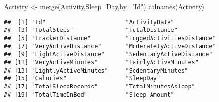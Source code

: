 \documentclass[
]{article}
\newenvironment{Shaded}{\begin{snugshade}}{\end{snugshade}}
\newcommand{\AttributeTok}[1]{\textcolor[rgb]{0.77,0.63,0.00}{#1}}
\newcommand{\DecValTok}[1]{\textcolor[rgb]{0.00,0.00,0.81}{#1}}
\newcommand{\FunctionTok}[1]{\textcolor[rgb]{0.00,0.00,0.00}{#1}}
\newcommand{\NormalTok}[1]{#1}
\newcommand{\OtherTok}[1]{\textcolor[rgb]{0.56,0.35,0.01}{#1}}
\newcommand{\SpecialCharTok}[1]{\textcolor[rgb]{0.00,0.00,0.00}{#1}}
\newcommand{\StringTok}[1]{\textcolor[rgb]{0.31,0.60,0.02}{#1}}
\begin{document}
\begin{Shaded}
\begin{Highlighting}[]
\NormalTok{Activity }\OtherTok{\textless{}{-}} \FunctionTok{merge}\NormalTok{(Activity,Sleep\_Day,}\AttributeTok{by=}\StringTok{"Id"}\NormalTok{)}
\FunctionTok{colnames}\NormalTok{(Activity)}
\end{Highlighting}
\end{Shaded}

\begin{verbatim}
##  [1] "Id"                       "ActivityDate"            
##  [3] "TotalSteps"               "TotalDistance"           
##  [5] "TrackerDistance"          "LoggedActivitiesDistance"
##  [7] "VeryActiveDistance"       "ModeratelyActiveDistance"
##  [9] "LightActiveDistance"      "SedentaryActiveDistance" 
## [11] "VeryActiveMinutes"        "FairlyActiveMinutes"     
## [13] "LightlyActiveMinutes"     "SedentaryMinutes"        
## [15] "Calories"                 "SleepDay"                
## [17] "TotalSleepRecords"        "TotalMinutesAsleep"      
## [19] "TotalTimeInBed"           "Sleep_Amount"
\end{verbatim}

\begin{Shaded}
\end{Shaded}
\end{document}

